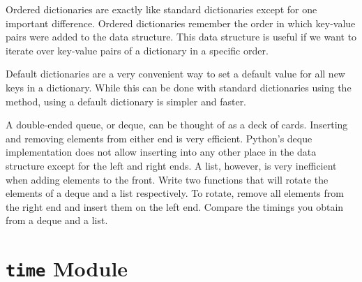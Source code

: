 Ordered dictionaries are exactly like standard dictionaries except for one important
difference.  Ordered dictionaries remember the order in which key-value pairs were added
to the data structure.  This data structure is useful if we want to iterate over key-value pairs
of a dictionary in a specific order.

Default dictionaries are a very convenient way to set a default value for all new keys in a dictionary.  While this can be done with standard dictionaries using the  method,
using a default dictionary is simpler and faster.




\begin{problem}
A double-ended queue, or deque, can be thought of as a deck of cards.
Inserting and removing elements from either end is very efficient.
Python's deque implementation does not allow inserting into any other place
in the data structure except for the left and right ends.
A list, however, is very inefficient when adding elements to the front.
Write two functions that will rotate the elements of a deque and a list respectively.
To rotate, remove all elements from the right end and insert them on the left end.
Compare the timings you obtain from a deque and a list.
\end{problem}



\section*{\texttt{time} Module}



